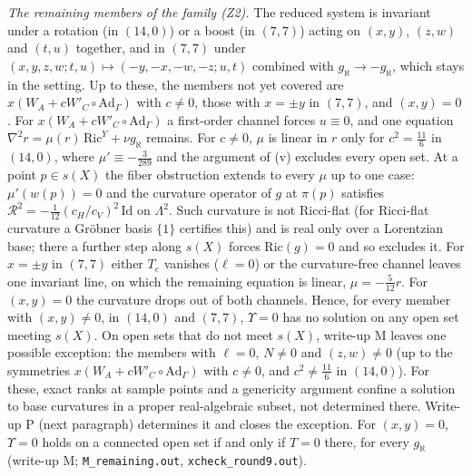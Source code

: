 \documentclass[11pt]{article}
\theoremstyle{remark}
\begin{document}
\emph{The remaining members of the family (Z2).} The reduced system is invariant under a rotation (in $(14,0)$) or a boost (in $(7,7)$) acting on $(x,y)$, $(z,w)$ and $(t,u)$ together, and in $(7,7)$ under $(x,y,z,w;t,u)\mapsto(-y,-x,-w,-z;u,t)$ combined with $g_\aleph\to-g_\aleph$, which stays in the setting. Up to these, the members not yet covered are $x(W_A+cW'_C\circ\mathrm{Ad}_\Gamma)$ with $c\neq0$, those with $x=\pm y$ in $(7,7)$, and $(x,y)=0$. For $x(W_A+cW'_C\circ\mathrm{Ad}_\Gamma)$ a first-order channel forces $u\equiv0$, and one equation $\nabla^2r=\mu(r)\,\mathrm{Ric}^Y+\nu g_\aleph$ remains. For $c\neq0$, $\mu$ is linear in $r$ only for $c^2=\tfrac{11}6$ in $(14,0)$, where $\mu'\equiv-\tfrac3{289}$ and the argument of (v) excludes every open set. At a point $p\in s(X)$ the fiber obstruction extends to every $\mu$ up to one case: $\mu'(w(p))=0$ and the curvature operator of $g$ at $\pi(p)$ satisfies $\mathcal R^2=-\tfrac1{12}(c_H/c_V)^2\,\mathrm{Id}$ on $\Lambda^2$. Such curvature is not Ricci-flat (for Ricci-flat curvature a Gr\"obner basis $\{1\}$ certifies this) and is real only over a Lorentzian base; there a further step along $s(X)$ forces $\mathrm{Ric}(g)=0$ and so excludes it. For $x=\pm y$ in $(7,7)$ either $T_e$ vanishes ($\ell=0$) or the curvature-free channel leaves one invariant line, on which the remaining equation is linear, $\mu=-\tfrac5{12}r$. For $(x,y)=0$ the curvature drops out of both channels. Hence, for every member with $(x,y)\neq0$, in $(14,0)$ and $(7,7)$, $\Upsilon=0$ has no solution on any open set meeting $s(X)$. On open sets that do not meet $s(X)$, write-up M leaves one possible exception: the members with $\ell=0$, $N\neq0$ and $(z,w)\neq0$ (up to the symmetries $x(W_A+cW'_C\circ\mathrm{Ad}_\Gamma)$ with $c\neq0$, and $c^2\neq\tfrac{11}6$ in $(14,0)$). For these, exact ranks at sample points and a genericity argument confine a solution to base curvatures in a proper real-algebraic subset, not determined there. Write-up P (next paragraph) determines it and closes the exception. For $(x,y)=0$, $\Upsilon=0$ holds on a connected open set if and only if $T=0$ there, for every $g_\aleph$ (write-up M; \texttt{M\_remaining.out}, \texttt{xcheck\_round9.out}).
\end{document}
